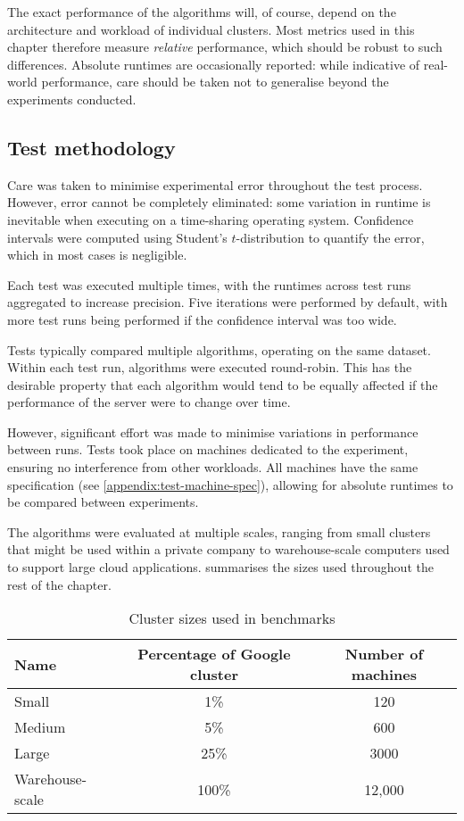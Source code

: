 The exact performance of the algorithms will, of course, depend on the architecture and workload of individual clusters. Most metrics used in this chapter therefore measure \emph{relative} performance, which should be robust to such differences. Absolute runtimes are occasionally reported: while indicative of real-world performance, care should be taken not to generalise beyond the experiments conducted.

\subsection{Test methodology} \label{sec:eval-benchmark-strategy-methodology}

Care was taken to minimise experimental error throughout the test process. However, error cannot be completely eliminated: some variation in runtime is inevitable when executing on a time-sharing operating system. Confidence intervals were computed using Student's $t$-distribution to quantify the error, which in most cases is negligible.

Each test was executed multiple times, with the runtimes across test runs aggregated to increase precision. Five iterations were performed by default, with more test runs being performed if the confidence interval was too wide.

Tests typically compared multiple algorithms, operating on the same dataset. Within each test run, algorithms were executed round-robin. This has the desirable property that each algorithm would tend to be equally affected if the performance of the server were to change over time.

However, significant effort was made to minimise variations in performance between runs. Tests took place on machines dedicated to the experiment, ensuring no interference from other workloads. All machines have the same specification (see \cref{appendix:test-machine-spec}), allowing for absolute runtimes to be compared between experiments.

The algorithms were evaluated at multiple scales, ranging from small clusters that might be used within a private company to warehouse-scale computers used to support large cloud applications.  summarises the sizes used throughout the rest of the chapter.

\begin{table}
    \centering
    \begin{tabular}{lcc}
        \textbf{Name} & \textbf{Percentage of Google cluster} & \textbf{Number of machines} \tabularnewline
        \hline
        Small & 1\% & 120 \tabularnewline
        Medium & 5\% & 600 \tabularnewline
        Large & 25\% & 3000 \tabularnewline 
        Warehouse-scale & 100\% & 12,000 \tabularnewline
    \end{tabular}
    \caption{Cluster sizes used in benchmarks}
    \label{table:cluster-sizes}
\end{table}

